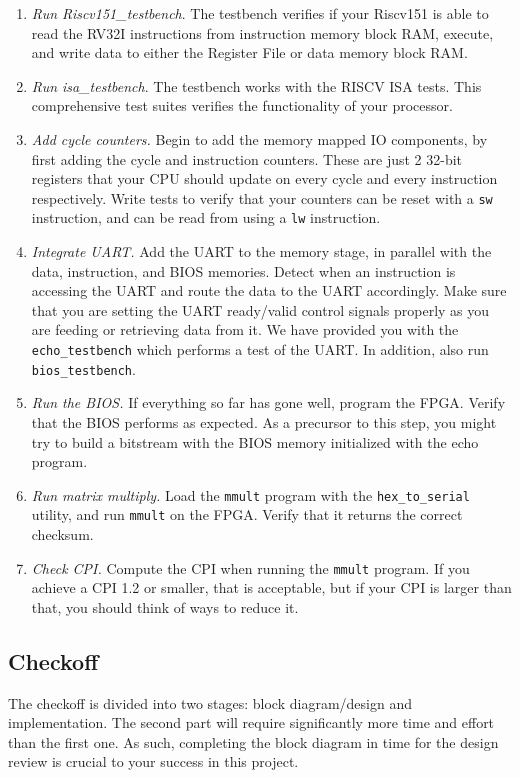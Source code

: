 \documentclass[11pt]{article}
\begin{document}
\begin{enumerate}
  \item \textit{Run Riscv151\_testbench}. The testbench verifies if your Riscv151 is able to read the RV32I instructions from instruction memory block RAM, execute, and write data to either the Register File or data memory block RAM.
  \item \textit{Run isa\_testbench}. The testbench works with the RISCV ISA tests. This comprehensive test suites verifies the functionality of your processor.
  \item \textit{Add cycle counters.} Begin to add the memory mapped IO components, by first adding the cycle and instruction counters. These are just 2 32-bit registers that your CPU should update on every cycle and every instruction respectively. Write tests to verify that your counters can be reset with a \verb|sw| instruction, and can be read from using a \verb|lw| instruction.
  \item \textit{Integrate UART.} Add the UART to the memory stage, in parallel with the data, instruction, and BIOS memories. Detect when an instruction is accessing the UART and route the data to the UART accordingly. Make sure that you are setting the UART ready/valid control signals properly as you are feeding or retrieving data from it. We have provided you with the \verb|echo_testbench| which performs a test of the UART. In addition, also run \verb|bios_testbench|.
  \item \textit{Run the BIOS.} If everything so far has gone well, program the FPGA. Verify that the BIOS performs as expected. As a precursor to this step, you might try to build a bitstream with the BIOS memory initialized with the echo program.
  \item \textit{Run matrix multiply.} Load the \verb|mmult| program with the \verb|hex_to_serial| utility, and run \verb|mmult| on the FPGA. Verify that it returns the correct checksum.
  \item \textit{Check CPI.} Compute the CPI when running the \verb|mmult| program. If you achieve a CPI 1.2 or smaller, that is acceptable, but if your CPI is larger than that, you should think of ways to reduce it.
\end{enumerate}

\subsection{Checkoff}
The checkoff is divided into two stages: block diagram/design and implementation.
The second part will require significantly more time and effort than the first one.
As such, completing the block diagram in time for the design review is crucial to your success in this project.
\end{document}
